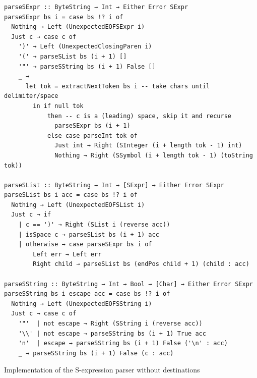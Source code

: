 \documentclass[english]{jflart}
\begin{document}
\begin{table}[t]
\small
\begin{verbatim}
parseSExpr :: ByteString → Int → Either Error SExpr
parseSExpr bs i = case bs !? i of
  Nothing → Left (UnexpectedEOFSExpr i)
  Just c → case c of
    ')' → Left (UnexpectedClosingParen i)
    '(' → parseSList bs (i + 1) []
    '"' → parseSString bs (i + 1) False []
    _ →
      let tok = extractNextToken bs i -- take chars until delimiter/space
        in if null tok
            then -- c is a (leading) space, skip it and recurse
              parseSExpr bs (i + 1)
            else case parseInt tok of
              Just int → Right (SInteger (i + length tok - 1) int)
              Nothing → Right (SSymbol (i + length tok - 1) (toString tok))

parseSList :: ByteString → Int → [SExpr] → Either Error SExpr
parseSList bs i acc = case bs !? i of
  Nothing → Left (UnexpectedEOFSList i)
  Just c → if
    | c == ')' → Right (SList i (reverse acc))
    | isSpace c → parseSList bs (i + 1) acc
    | otherwise → case parseSExpr bs i of
        Left err → Left err
        Right child → parseSList bs (endPos child + 1) (child : acc)

parseSString :: ByteString → Int → Bool → [Char] → Either Error SExpr
parseSString bs i escape acc = case bs !? i of
  Nothing → Left (UnexpectedEOFSString i)
  Just c → case c of
    '"'  | not escape → Right (SString i (reverse acc))
    '\\' | not escape → parseSString bs (i + 1) True acc
    'n'  | escape → parseSString bs (i + 1) False ('\n' : acc)
    _ → parseSString bs (i + 1) False (c : acc)
\end{verbatim}
\caption{Implementation of the S-expression parser without destinations}
\label{table:impl-sexpr-parser-without-dest}
\end{table}
\end{document}
